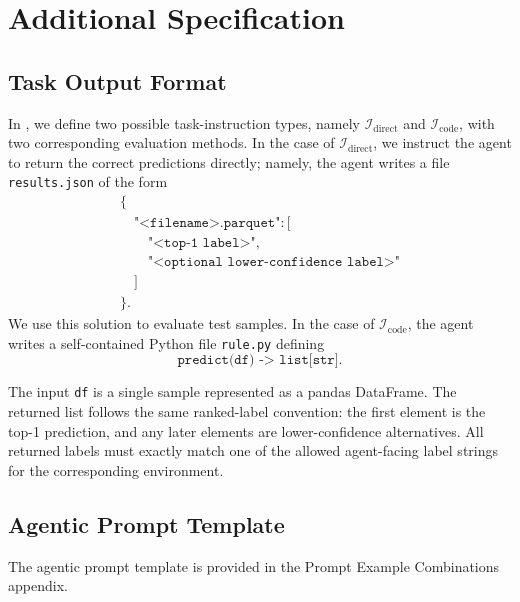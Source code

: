 \section{Additional Specification}
\label{app:additional-specification}

\subsection{Task Output Format}
\label{app:task-output-format}

In \name{}, we define two possible task-instruction types, namely \(\mathcal{I}_{\mathrm{direct}}\) and \(\mathcal{I}_{\mathrm{code}}\), with two corresponding evaluation methods.
In the case of \(\mathcal{I}_{\mathrm{direct}}\), we instruct the agent to return the correct predictions directly; namely, the agent writes a file \texttt{results.json} of the form
\[
\begin{array}{l}
\{ \\
\quad \texttt{"<filename>.parquet"}: [ \\
\quad\quad \texttt{"<top-1 label>"}, \\
\quad\quad \texttt{"<optional lower-confidence label>"} \\
\quad ] \\
\}.
\end{array}
\]
We use this solution to evaluate test samples.
In the case of \(\mathcal{I}_{\mathrm{code}}\), the agent writes a self-contained Python file \texttt{rule.py} defining
\[
\texttt{predict(df) -> list[str]}.
\]

The input \texttt{df} is a single sample represented as a pandas DataFrame.
The returned list follows the same ranked-label convention: the first element is the top-1 prediction, and any later elements are lower-confidence alternatives.
All returned labels must exactly match one of the allowed agent-facing label strings for the corresponding environment.

\subsection{Agentic Prompt Template}
\label{app:agentic-prompt}

The agentic prompt template is provided in the Prompt Example Combinations appendix.
